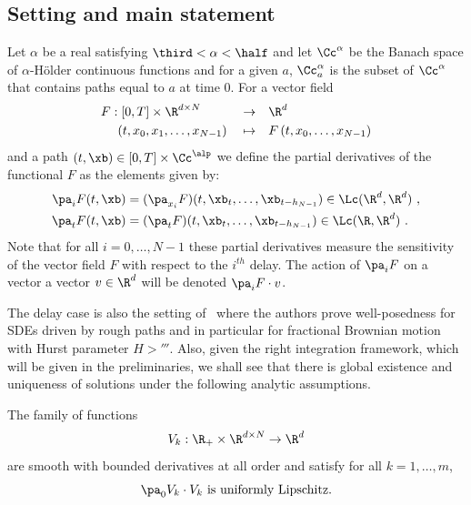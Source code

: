 
\subsection{Setting and main statement}
Let $\alpha$ be a real satisfying $\third < \alpha < \half$ and let $\Cc^\alpha$ be the Banach space of $\alpha$-H\"older continuous functions and for a given $a$, $\Cc^\alpha_{a}$ is the subset of $\Cc^\alpha$ that contains paths equal to $a$ at time $0$. For a vector field
\[
\begin{aligned}
F: &\;[0,T]\times \R^{d\times N}&  &\to & &\R^d\\
& (t, x_0, x_1, \dots, x_{N-1})& &\mapsto & &F\left(t, x_0, \dots, x_{N-1} \right)
\end{aligned}
\]
and a path $(t,\xb)\in [0,T]\times \Cc^\alp$ we define the partial derivatives of the functional $F$ as the elements given by:
\begin{align}\label{def:partial-derivatives}
\pa_i F(t,\xb)&=(\pa_{x_i}F)(t,\xb_t,\dots,\xb_{t-h_{N-1}}) \in \Lc(\R^d, \R^d) \ ,\\
\pa_t F(t,\xb)&=(\pa_{t}F)(t,\xb_t,\dots,\xb_{t-h_{N-1}})\in \Lc(\R, \R^d) \ .
\end{align}
Note that for all $i=0,\dots, N-1$ these partial derivatives measure the sensitivity of the vector field $F$ with respect to the $i^{th}$ delay. The action of $\pa_i F$ on a vector a vector $v \in \R^d$ will be denoted $\pa_i F \cdot v$.

The delay case is also the setting of~\cite{nnt2008} where the authors prove well-posedness for SDEs driven by rough paths and in particular for fractional Brownian motion with Hurst parameter $H>\third$. Also, given the right integration framework, which will be given in the preliminaries, we shall see that there is global existence and uniqueness of solutions under the following analytic assumptions.

\begin{assumption}\label{assumptions:analytic}
The family of functions
\[
V_k:\R_+\times \R^{d\times N}\to \R^d
\]
are smooth with bounded derivatives at all order and satisfy for all $k=1,\dots, m$,
\begin{equation}\label{eq:lip_product}
\pa_0 V_k \cdot V_k \text{ is uniformly Lipschitz}.
\end{equation}
\end{assumption}

